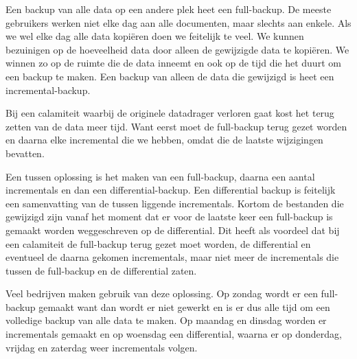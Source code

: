 Een backup van alle data op een andere plek heet een full-backup. De meeste gebruikers werken niet elke dag aan alle documenten, maar slechts aan enkele. Als we wel elke dag alle data kopi\"eren doen we feitelijk te veel. We kunnen bezuinigen op de hoeveelheid data door alleen de gewijzigde data te kopi\"eren. We winnen zo op de ruimte die de data inneemt en ook op de tijd die het duurt om een backup te maken. Een backup van alleen de data die gewijzigd is heet een incremental-backup.

Bij een calamiteit waarbij de originele datadrager verloren gaat kost het terug zetten van de data meer tijd. Want eerst moet de full-backup terug gezet worden en daarna elke incremental die we hebben, omdat die de laatste wijzigingen bevatten.

Een tussen oplossing is het maken van een full-backup, daarna een aantal incrementals en dan een differential-backup. Een differential backup is feitelijk een samenvatting van de tussen liggende incrementals. Kortom de bestanden die gewijzigd zijn vanaf het moment dat er voor de laatste keer een full-backup is gemaakt worden weggeschreven op de differential. Dit heeft als voordeel dat bij een calamiteit de full-backup terug gezet moet worden, de differential en eventueel de daarna gekomen incrementals, maar niet meer de incrementals die tussen de full-backup en de differential zaten.

Veel bedrijven maken gebruik van deze oplossing. Op zondag wordt er een full-backup gemaakt want dan wordt er niet gewerkt en is er dus alle tijd om een volledige backup van alle data te maken. Op maandag en dinsdag worden er incrementals gemaakt en op woensdag een differential, waarna er op donderdag, vrijdag en zaterdag weer incrementals volgen.

